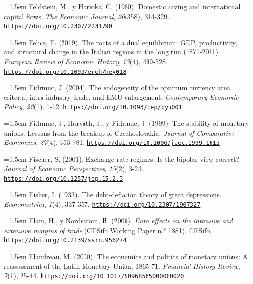 \documentclass[10pt,a4paper]{article}
\begin{document}
\noindent\hangindent=1.5em Feldstein, M., y Horioka, C. (1980). Domestic saving and international capital flows. \textit{The Economic Journal}, \textit{90}(358), 314-329. \href{https://doi.org/10.2307/2231790}{\nolinkurl{https://doi.org/10.2307/2231790}}

\noindent\hangindent=1.5em Felice, E. (2019). The roots of a dual equilibrium: GDP, productivity, and structural change in the Italian regions in the long run (1871-2011). \textit{European Review of Economic History}, \textit{23}(4), 499-528. \href{https://doi.org/10.1093/ereh/hey018}{\nolinkurl{https://doi.org/10.1093/ereh/hey018}}

\noindent\hangindent=1.5em Fidrmuc, J. (2004). The endogeneity of the optimum currency area criteria, intra-industry trade, and EMU enlargement. \textit{Contemporary Economic Policy}, \textit{22}(1), 1-12. \href{https://doi.org/10.1093/cep/byh001}{\nolinkurl{https://doi.org/10.1093/cep/byh001}}

\noindent\hangindent=1.5em Fidrmuc, J., Horváth, J., y Fidrmuc, J. (1999). The stability of monetary unions: Lessons from the breakup of Czechoslovakia. \textit{Journal of Comparative Economics}, \textit{27}(4), 753-781. \href{https://doi.org/10.1006/jcec.1999.1615}{\nolinkurl{https://doi.org/10.1006/jcec.1999.1615}}

\noindent\hangindent=1.5em Fischer, S. (2001). Exchange rate regimes: Is the bipolar view correct? \textit{Journal of Economic Perspectives}, \textit{15}(2), 3-24. \href{https://doi.org/10.1257/jep.15.2.3}{\nolinkurl{https://doi.org/10.1257/jep.15.2.3}}

\noindent\hangindent=1.5em Fisher, I. (1933). The debt-deflation theory of great depressions. \textit{Econometrica}, \textit{1}(4), 337-357. \href{https://doi.org/10.2307/1907327}{\nolinkurl{https://doi.org/10.2307/1907327}}

\noindent\hangindent=1.5em Flam, H., y Nordström, H. (2006). \textit{Euro effects on the intensive and extensive margins of trade} (CESifo Working Paper n.º 1881). CESifo. \href{https://doi.org/10.2139/ssrn.956274}{\nolinkurl{https://doi.org/10.2139/ssrn.956274}}

\noindent\hangindent=1.5em Flandreau, M. (2000). The economics and politics of monetary unions: A reassessment of the Latin Monetary Union, 1865-71. \textit{Financial History Review}, \textit{7}(1), 25-44. \href{https://doi.org/10.1017/S0968565000000020}{\nolinkurl{https://doi.org/10.1017/S0968565000000020}}
\end{document}

